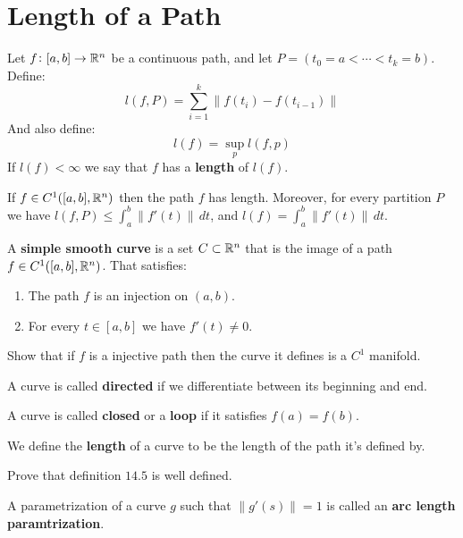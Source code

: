 \documentclass[11pt,a4paper]{article}
\begin{document}
\newpage

\section{Length of a Path}
\begin{definition}
  Let $f \colon [a,b] \to \mathbb{R}^n$ be a continuous path, and let
  $P = (t_0 = a < \cdots < t_k = b)$. Define:
  \[
    l(f,P) = \sum_{i=1}^{k}{\|f(t_i) - f(t_{i-1})\|}
  \]
  And also define:
  \[
    l(f) = \sup_{p}{l(f,p)}
  \]
  If $l(f) < \infty$ we say that $f$ has a \textbf{length} of
  $l(f)$.
\end{definition}
\begin{proposition}
  If $f \in C^1([a,b], \mathbb{R}^n)$ then the path $f$ has length.
  Moreover, for every partition $P$ we have 
  $l(f,P) \le \int_{a}^{b}{\|f'(t)\|\,dt}$, and 
  $l(f) = \int_{a}^{b}{\|f'(t)\|\,dt}$.
\end{proposition}


\begin{definition}
  A \textbf{simple smooth curve} is a set $C \subset \mathbb{R}^n$ that
  is the image of a path $f \in C^1([a,b],\mathbb{R}^n)$. That satisfies:
  \begin{enumerate}
    \item The path $f$ is an injection on $(a,b)$.
    \item For every $t \in [a,b]$ we have $f'(t) \neq 0$.
  \end{enumerate}
\end{definition}
Show that if $f$ is a injective path then the curve it defines is
a $C^1$ manifold.
\begin{definition}
  A curve is called \textbf{directed} if we differentiate between
  its beginning and end.
\end{definition}
\begin{definition}
  A curve is called \textbf{closed} or a \textbf{loop} if it
  satisfies $f(a) = f(b)$.
\end{definition}
\begin{definition}
  We define the \textbf{length} of a curve to be the length
  of the path it's defined by.
\end{definition}
Prove that definition $14.5$ is well defined.
\begin{definition}
  A parametrization of a curve $g$ such that $\|g'(s)\| = 1$
  is called an \textbf{arc length paramtrization}.
\end{definition}
\end{document}
